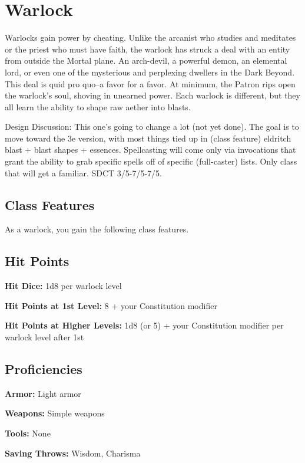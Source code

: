 \section{Warlock}\label{class:warlock}

Warlocks gain power by cheating. Unlike the arcanist who studies and meditates or the priest who must have faith, the warlock has struck a deal with an entity from outside the Mortal plane. An arch-devil, a powerful demon, an elemental lord, or even one of the mysterious and perplexing dwellers in the Dark Beyond. This deal is quid pro quo--a favor for a favor. At minimum, the Patron rips open the warlock's soul, shoving in unearned power. Each warlock is different, but they all learn the ability to shape raw aether into blasts.

Design Discussion: This one's going to change a lot (not yet done). The goal is to move toward the 3e version, with most things tied up in (class feature) eldritch blast + blast shapes + essences. Spellcasting will come only via invocations that grant the ability to grab specific spells off of specific (full-caster) lists. Only class that will get a familiar. SDCT 3/5-7/5-7/5.

\subsection{Class Features}

As a warlock, you gain the following class features.

\subsection{Hit Points}

\textbf{Hit Dice:} 1d8 per warlock level

\textbf{Hit Points at 1st Level:} 8 + your Constitution modifier

\textbf{Hit Points at Higher Levels:} 1d8 (or 5) + your Constitution modifier per warlock level after 1st

\subsection{Proficiencies}

\textbf{Armor:} Light armor

\textbf{Weapons:} Simple weapons

\textbf{Tools:} None

\textbf{Saving Throws:} Wisdom, Charisma

